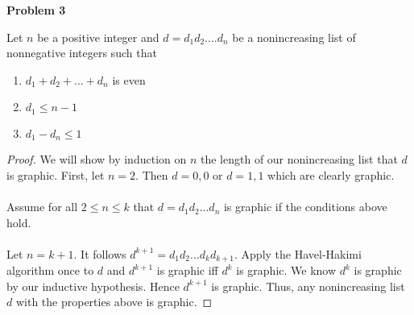 \documentclass{article}
\newenvironment{claim}[2][Claim]{\begin{trivlist}
		\item[\hskip \labelsep {\bfseries #1}\hskip \labelsep {\bfseries #2}]}{\end{trivlist}}
\begin{document}
\noindent \textbf{Problem 3}
\begin{claim}{}
	Let $n$ be a positive integer and $d = d_1 d_2 .... d_n$ be a nonincreasing list of nonnegative integers such that 
	\begin{enumerate}[label=\alph*)]
		\item $ d_1 + d_2 + ... + d_n $ is even
		\item $d_1 \leq n - 1$
		\item $d_1 - d_n \leq 1$
	\end{enumerate} 
\end{claim}
\begin{proof}
	We will show by induction on $n$ the length of our nonincreasing list that $d$ is graphic.
	First, let $n = 2$. Then  $d = 0,0$ or $ d = 1,1$ which are clearly graphic.\\\\
	Assume for all $2 \leq n \leq k$ that $d = d_1 d_2 ... d_n$ is graphic if the conditions above hold.\\\\
	Let $n = k + 1$. It follows $d^{k + 1} = d_1 d_2 ... d_k d_{k + 1}$. 
	Apply the Havel-Hakimi algorithm once to $d$ and $d^{k+1}$ is graphic iff $d^k$ is graphic. We know $d^k$ is graphic by our inductive hypothesis. Hence $d^{k + 1}$ is graphic. Thus, any nonincreasing list $d$ with the properties above is graphic.
\end{proof}
\end{document}
